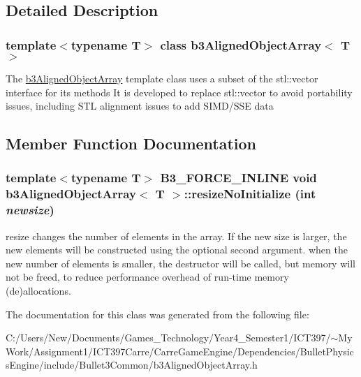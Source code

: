\subsection{Detailed Description}
\subsubsection*{template$<$typename T$>$ class b3AlignedObjectArray$<$ T $>$}

The \hyperlink{classb3_aligned_object_array}{b3AlignedObjectArray} template class uses a subset of the stl::vector interface for its methods It is developed to replace stl::vector to avoid portability issues, including STL alignment issues to add SIMD/SSE data 

\subsection{Member Function Documentation}
\hypertarget{classb3_aligned_object_array_5f21071bc7b73c1a0b4fcfde123e5182}{
\subsubsection[resizeNoInitialize]{\setlength{\rightskip}{0pt plus 5cm}template$<$typename T$>$ B3\_\-FORCE\_\-INLINE void {\bf b3AlignedObjectArray}$<$ T $>$::resizeNoInitialize (int {\em newsize})}}
\label{classb3_aligned_object_array_5f21071bc7b73c1a0b4fcfde123e5182}


resize changes the number of elements in the array. If the new size is larger, the new elements will be constructed using the optional second argument. when the new number of elements is smaller, the destructor will be called, but memory will not be freed, to reduce performance overhead of run-time memory (de)allocations. 

The documentation for this class was generated from the following file:\begin{CompactItemize}
\item 
C:/Users/New/Documents/Games\_\-Technology/Year4\_\-Semester1/ICT397/$\sim$My Work/Assignment1/ICT397Carre/CarreGameEngine/Dependencies/BulletPhysicsEngine/include/Bullet3Common/b3AlignedObjectArray.h\end{CompactItemize}
